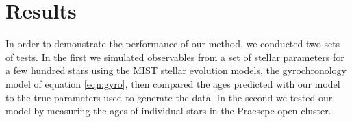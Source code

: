 \section{Results}
\label{section:results}

In order to demonstrate the performance of our method, we conducted two sets
of tests.
In the first we simulated observables from a set of stellar parameters for a
few hundred stars using the MIST stellar evolution models, the gyrochronology
model of equation \ref{eqn:gyro}, then compared the ages predicted with
our model to the true parameters used to generate the data.
In the second we tested our model by measuring the ages of individual stars in
the Praesepe open cluster.

